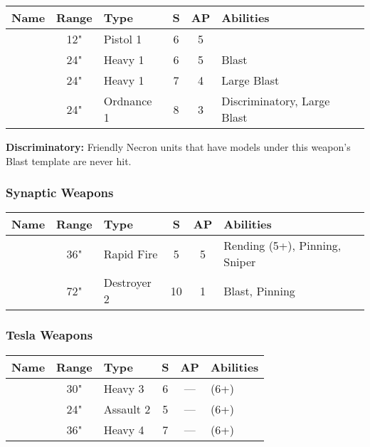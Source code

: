 \label{Particle Caster} \label{Particle Beamer} \label{Particle Shredder} \label{Particle Whip}
\noindent
\begin{NiceTabular}{L{115 pt} c C{40pt} *{2}{c} >{\raggedright\arraybackslash}p{240pt}}
	Name & Range & Type & S & AP & Abilities \\
	\hline
	 & 12" & Pistol 1 & 6 & 5 & \\
	  & 24" & Heavy 1 & 6 & 5 & Blast \\
	 & 24" & Heavy 1 & 7 & 4 & Large Blast \\
	  & 24" & Ordnance 1 & 8 & 3 & Discriminatory, Large Blast \\
\end{NiceTabular}

\vspace*{1em}
\textbf{Discriminatory:} Friendly Necron units that have models under this weapon's Blast template are never hit.


\subsubsection{Synaptic Weapons}
\label{Synaptic Disintegrator}
\noindent
\begin{NiceTabular}{L{115 pt} c C{40pt} *{2}{c} >{\raggedright\arraybackslash}p{240pt}}
	Name & Range & Type & S & AP & Abilities \\
	\hline
	 & 36" & Rapid Fire & 5 & 5 & Rending (5+), Pinning, Sniper \\	
	  & 72" & Destroyer 2 & 10 & 1 & Blast, Pinning \\
\end{NiceTabular}

\subsubsection{Tesla Weapons}
\label{Tesla Cannon} \label{Tesla Carbine} \label{Tesla Destructor}
\noindent
\begin{NiceTabular}{L{115 pt} c C{40pt} *{2}{c} >{\raggedright\arraybackslash}p{240pt}}
	Name & Range & Type & S & AP & Abilities \\
	\hline
	 & 30" & Heavy 3 & 6 & — &  (6+) \\
	  & 24" & Assault 2 & 5 & — &  (6+) \\	
	 & 36" & Heavy 4 & 7 & — &  (6+)
\end{NiceTabular}


